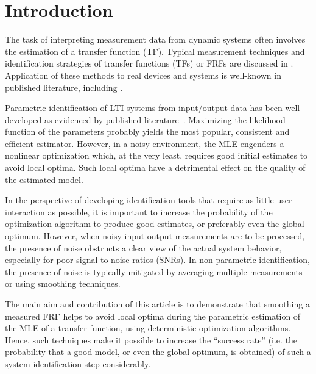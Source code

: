 \section{Introduction}\label{se:introd}

The task of interpreting measurement data from dynamic systems often involves the estimation of a transfer function (TF). 
Typical measurement techniques and identification strategies of transfer functions (TFs) or \glspl{FRF} are discussed in \citep{Schoukens1998,Schoukens2006LPM,Guillaume1996,Broersen1995,Pintelon2010LPM1,Antoni2007FRF}.
Application of these methods to real devices and systems is well-known in published literature, including \citep{Lim2010,Robinson1990,Behjat2010}.

Parametric identification of \gls{LTI} systems from input/output data has been well developed as evidenced by published literature~\citep{Pintelon2012,Ljung1999,Schoukens1999,Pintelon1998}. 
 Maximizing the likelihood function of the parameters probably yields the most popular, consistent and efficient estimator. 
 However, in a noisy environment, the \gls{MLE} engenders a nonlinear optimization which, at the very least, requires good initial estimates to avoid local optima.
 Such local optima have a detrimental effect on the quality of the estimated model.

 In the perspective of developing identification tools that require as little user interaction as possible, it is important to increase the probability of the optimization algorithm to produce good estimates, or preferably even the global optimum.
 However, when noisy input-output measurements are to be processed, the presence of noise obstructs a clear view of the actual system behavior, especially for poor signal-to-noise ratios (SNRs).
 In non-parametric identification, the presence of noise is typically mitigated by averaging multiple measurements or using smoothing techniques.

The main aim and contribution of this article is to demonstrate that smoothing a measured \gls{FRF} helps to avoid local optima during the parametric estimation of the \gls{MLE} of a transfer function, using deterministic optimization algorithms.
Hence, such techniques make it possible to increase the ``success rate'' (i.e. the probability that a good model, or even the global optimum, is obtained) of such a system identification step considerably.


